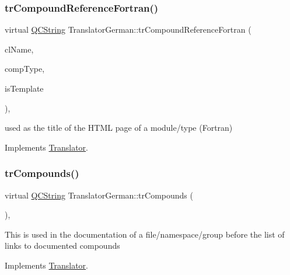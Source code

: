 \subsubsection{\texorpdfstring{trCompoundReferenceFortran()}{trCompoundReferenceFortran()}}
{\footnotesize\ttfamily virtual \mbox{\hyperlink{class_q_c_string}{Q\+C\+String}} Translator\+German\+::tr\+Compound\+Reference\+Fortran (\begin{DoxyParamCaption}\item[{const char $\ast$}]{cl\+Name,  }\item[{\mbox{\hyperlink{class_class_def_ae70cf86d35fe954a94c566fbcfc87939}{Class\+Def\+::\+Compound\+Type}}}]{comp\+Type,  }\item[{bool}]{is\+Template }\end{DoxyParamCaption})\hspace{0.3cm}{\ttfamily [inline]}, {\ttfamily [virtual]}}

used as the title of the H\+T\+ML page of a module/type (Fortran) 

Implements \mbox{\hyperlink{class_translator}{Translator}}.

\mbox{\label{class_translator_german_accc117cc69d44e1bd8a638ae9a9cc071}} 
\subsubsection{\texorpdfstring{trCompounds()}{trCompounds()}}
{\footnotesize\ttfamily virtual \mbox{\hyperlink{class_q_c_string}{Q\+C\+String}} Translator\+German\+::tr\+Compounds (\begin{DoxyParamCaption}{ }\end{DoxyParamCaption})\hspace{0.3cm}{\ttfamily [inline]}, {\ttfamily [virtual]}}

This is used in the documentation of a file/namespace/group before the list of links to documented compounds 

Implements \mbox{\hyperlink{class_translator}{Translator}}.

\mbox{\label{class_translator_german_a920f9105e4f8edb916bd27581b6979f3}} 
